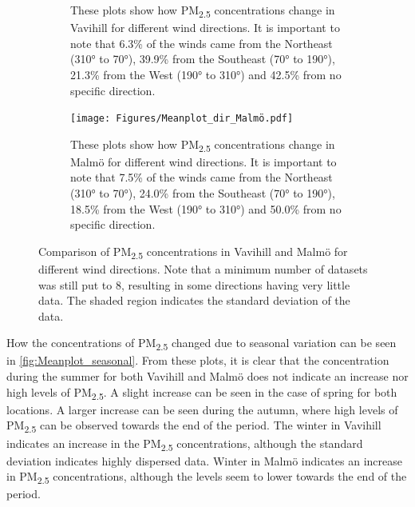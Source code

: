 \begin{figure}[H]
\begin{subfigure}[b]{0.49\textwidth}
        \caption{These plots show how PM\textsubscript{2.5} concentrations change in Vavihill for different wind directions. It is important to note that 6.3\% of the winds came from the Northeast (310° to 70°), 39.9\% from the Southeast (70° to 190°), 21.3\% from the West (190° to 310°) and 42.5\% from no specific direction.}
        \label{fig:Meanplot_dir_Vavihill}
    \end{subfigure}
    \hfill
    \begin{subfigure}[b]{0.49\textwidth}
        \centering
        \texttt{[image: Figures/Meanplot\_dir\_Malmö.pdf]}
        \caption{These plots show how PM\textsubscript{2.5} concentrations change in Malmö for different wind directions. It is important to note that 7.5\% of the winds came from the Northeast (310° to 70°), 24.0\% from the Southeast (70° to 190°), 18.5\% from the West (190° to 310°) and 50.0\% from no specific direction.}
        \label{fig:Meanplot_dir_Malmö}
    \end{subfigure}
    \caption{Comparison of PM\textsubscript{2.5} concentrations in Vavihill and Malmö for different wind directions. Note that a minimum number of datasets was still put to 8, resulting in some directions having very little data. The shaded region indicates the standard deviation of the data. }
    \label{fig:Meanplot_wind}
\end{figure}

How the concentrations of PM\textsubscript{2.5} changed due to seasonal variation can be seen in \autoref{fig:Meanplot_seasonal}. From these plots, it is clear that the concentration during the summer for both Vavihill and Malmö does not indicate an increase nor high levels of PM\textsubscript{2.5}. A slight increase can be seen in the case of spring for both locations. A larger increase can be seen during the autumn, where high levels of PM\textsubscript{2.5} can be observed towards the end of the period. The winter in Vavihill indicates an increase in the PM\textsubscript{2.5} concentrations, although the standard deviation indicates highly dispersed data. Winter in Malmö indicates an increase in PM\textsubscript{2.5} concentrations, although the levels seem to lower towards the end of the period.

